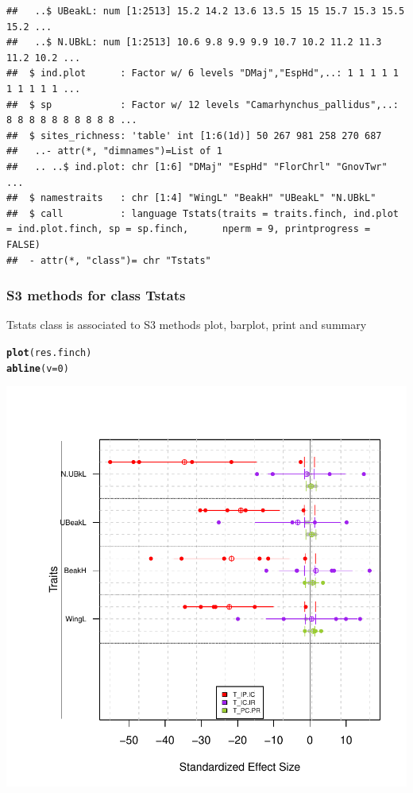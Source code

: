 \documentclass[12pt]{article}\usepackage[]{graphicx}\usepackage[]{color}
\makeatletter
\def\maxwidth{ %
  \ifdim\Gin@nat@width>\linewidth
    \linewidth
  \else
    \Gin@nat@width
  \fi
}
\newcommand{\hlnum}[1]{\textcolor[rgb]{0.686,0.059,0.569}{#1}}%
\newcommand{\hlstd}[1]{\textcolor[rgb]{0.345,0.345,0.345}{#1}}%
\newcommand{\hlkwc}[1]{\textcolor[rgb]{0.333,0.667,0.333}{#1}}%
\newcommand{\hlkwd}[1]{\textcolor[rgb]{0.737,0.353,0.396}{\textbf{#1}}}%
\newenvironment{kframe}{%
 \def\at@end@of@kframe{}%
 \ifinner\ifhmode%
  \def\at@end@of@kframe{\end{minipage}}%
  \begin{minipage}{\columnwidth}%
 \fi\fi%
 \def\FrameCommand##1{\hskip\@totalleftmargin \hskip-\fboxsep
 \colorbox{shadecolor}{##1}\hskip-\fboxsep
     \hskip-\linewidth \hskip-\@totalleftmargin \hskip\columnwidth}%
 \MakeFramed {\advance\hsize-\width
   \@totalleftmargin\z@ \linewidth\hsize
   \@setminipage}}%
 {\par\unskip\endMakeFramed%
 \at@end@of@kframe}
\newenvironment{knitrout}{}{} %
\makeatother
\begin{document}
\begin{knitrout}
\begin{kframe}
\begin{verbatim}
##   ..$ UBeakL: num [1:2513] 15.2 14.2 13.6 13.5 15 15 15.7 15.3 15.5 15.2 ...
##   ..$ N.UBkL: num [1:2513] 10.6 9.8 9.9 9.9 10.7 10.2 11.2 11.3 11.2 10.2 ...
##  $ ind.plot      : Factor w/ 6 levels "DMaj","EspHd",..: 1 1 1 1 1 1 1 1 1 1 ...
##  $ sp            : Factor w/ 12 levels "Camarhynchus_pallidus",..: 8 8 8 8 8 8 8 8 8 8 ...
##  $ sites_richness: 'table' int [1:6(1d)] 50 267 981 258 270 687
##   ..- attr(*, "dimnames")=List of 1
##   .. ..$ ind.plot: chr [1:6] "DMaj" "EspHd" "FlorChrl" "GnovTwr" ...
##  $ namestraits   : chr [1:4] "WingL" "BeakH" "UBeakL" "N.UBkL"
##  $ call          : language Tstats(traits = traits.finch, ind.plot = ind.plot.finch, sp = sp.finch,      nperm = 9, printprogress = FALSE)
##  - attr(*, "class")= chr "Tstats"
\end{verbatim}
\end{kframe}
\end{knitrout}


\subsubsection{S3 methods for class Tstats}
Tstats class is associated to S3 methods plot, barplot, print and summary

\begin{knitrout}
\color{fgcolor}\begin{kframe}
\begin{alltt}
\hlkwd{plot}\hlstd{(res.finch)}
\hlkwd{abline}\hlstd{(}\hlkwc{v}\hlstd{=}\hlnum{0}\hlstd{)}
\end{alltt}
\end{kframe}

{\centering \includegraphics[width=\maxwidth]{figure/unnamed-chunk-29} 

}



\end{knitrout}
\end{document}
